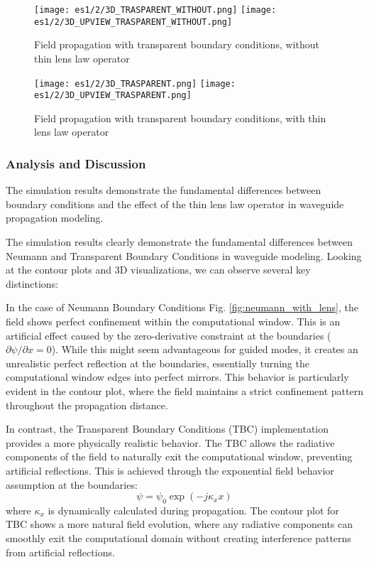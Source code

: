 \documentclass{article}
\begin{document}
\begin{figure}[h]
\centering
    \texttt{[image: es1/2/3D\_TRASPARENT\_WITHOUT.png]}
    \texttt{[image: es1/2/3D\_UPVIEW\_TRASPARENT\_WITHOUT.png]}
\caption{Field propagation with transparent boundary conditions, without thin lens law operator}
\label{fig:tbc_no_lens}
\end{figure}

\begin{figure}[h]
\centering
\texttt{[image: es1/2/3D\_TRASPARENT.png]}
\texttt{[image: es1/2/3D\_UPVIEW\_TRASPARENT.png]}
\caption{Field propagation with transparent boundary conditions, with thin lens law operator}
\label{fig:tbc_with_lens}
\end{figure}





\subsubsection{Analysis and Discussion}

The simulation results demonstrate the fundamental differences between boundary conditions and the effect of the thin lens law operator in waveguide propagation modeling.

The simulation results clearly demonstrate the fundamental differences between Neumann and Transparent Boundary Conditions in waveguide modeling. Looking at the contour plots and 3D visualizations, we can observe several key distinctions:

In the case of Neumann Boundary Conditions Fig. \ref{fig:neumann_with_lens}, the field shows perfect confinement within the computational window. This is an artificial effect caused by the zero-derivative constraint at the boundaries ($\partial\psi/\partial x = 0$). While this might seem advantageous for guided modes, it creates an unrealistic perfect reflection at the boundaries, essentially turning the computational window edges into perfect mirrors. This behavior is particularly evident in the contour plot, where the field maintains a strict confinement pattern throughout the propagation distance.

In contrast, the Transparent Boundary Conditions (TBC) implementation provides a more physically realistic behavior. The TBC allows the radiative components of the field to naturally exit the computational window, preventing artificial reflections. This is achieved through the exponential field behavior assumption at the boundaries:
\begin{equation}
\psi = \psi_0\exp(-j\kappa_xx)
\end{equation}
where $\kappa_x$ is dynamically calculated during propagation. The contour plot for TBC shows a more natural field evolution, where any radiative components can smoothly exit the computational domain without creating interference patterns from artificial reflections.
\end{document}
